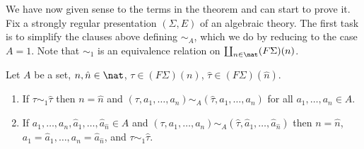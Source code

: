 We have now given sense to the terms in the theorem and can start to prove
it.  Fix a strongly regular presentation $(\Sigma, E)$ of an algebraic
theory.  The first task is to simplify the clauses above defining $\sim_A$,
which we do by reducing to the case $A=1$.  Note that $\sim_1$ is an
equivalence relation on $\coprod_{n\in\nat} (F\Sigma)(n)$.


%
\begin{lemma}
Let $A$ be a set, $n, \hat{n} \in \nat$, $\tau \in (F\Sigma)(n)$,
$\hat{\tau} \in (F\Sigma)(\hat{n})$.
%
\begin{enumerate}
\item 	{}
If $\tau \sim_1 \hat{\tau}$ then $n = \hat{n}$ and $(\tau, a_1, \ldots,
a_n) \sim_A (\hat{\tau}, a_1, \ldots, a_n)$ for all $a_1, \ldots, a_n \in
A$. 
\item 	{}
If $a_1, \ldots, a_n, \hat{a}_1, \ldots, \hat{a}_{\hat{n}} \in A$ and $(\tau,
a_1, \ldots, a_n) \sim_A (\hat{\tau}, \hat{a}_1, \ldots, \hat{a}_{\hat{n}})$
then $n=\hat{n}$, $a_1=\hat{a}_1, \ldots, a_n=\hat{a}_{\hat{n}}$, and $\tau
\sim_1 \hat{\tau}$.
\end{enumerate}
\end{lemma}

